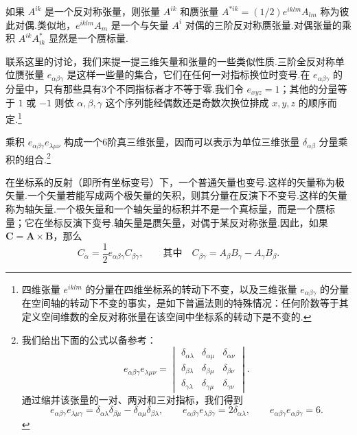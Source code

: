 如果 $A^{ik}$ 是一个反对称张量，则张量 $A^{ik}$ 和赝张量 $A^{*ik}=(1/2)e^{iklm}A_{lm}$ 称为彼此对偶.类似地，$e^{iklm}A_m$ 是一个与矢量 $A^i$ 对偶的三阶反对称赝张量.对偶张量的乘积 $A^{ik}A^{*}_{ik}$ 显然是一个赝标量.

联系这里的讨论，我们来提一提三维矢量和张量的一些类似性质.三阶全反对称单位赝张量 $e_{\alpha\beta\gamma}$ 是这样一些量的集合，它们在任何一对指标换位时变号.在 $e_{\alpha\beta\gamma}$ 的分量中，只有那些具有3个不同指标者才不等于零.我们令 $e_{xyz}=1$；其他的分量等于 $1$ 或 $-1$ 则依 $\alpha,\beta,\gamma$ 这个序列能经偶数还是奇数次换位排成 $x,y,z$ 的顺序而定.\footnote{四维张量 $e^{iklm}$ 的分量在四维坐标系的转动下不变，以及三维张量 $e_{\alpha\beta\gamma}$ 的分量在空间轴的转动下不变的事实，是如下普遍法则的特殊情况：任何阶数等于其定义空间维数的全反对称张量在该空间中坐标系的转动下是不变的.}

乘积 $e_{\alpha\beta\gamma}e_{\lambda\mu\nu}$ 构成一个6阶真三维张量，因而可以表示为单位三维张量 $\delta_{\alpha\beta}$ 分量乘积的组合.\footnote{我们给出下面的公式以备参考：
\begin{equation*}
  e_{\alpha\beta\gamma}e_{\lambda\mu\nu}=\begin{vmatrix}
    \delta_{\alpha\lambda} & \delta_{\alpha\mu} & \delta_{\alpha\nu}\\
    \delta_{\beta\lambda} & \delta_{\beta\mu} & \delta_{\beta\nu}\\
    \delta_{\gamma\lambda} & \delta_{\gamma\mu} & \delta_{\gamma\nu}
  \end{vmatrix}.
\end{equation*}
通过缩并该张量的一对、两对和三对指标，我们得到
\begin{equation*}
  e_{\alpha\beta\gamma}e_{\lambda\mu\gamma}=\delta_{\alpha\lambda}\delta_{\beta\mu}-\delta_{\alpha\mu}\delta_{\beta\lambda},\qquad
  e_{\alpha\beta\gamma}e_{\lambda\beta\gamma}=2\delta_{\alpha\lambda},\qquad
  e_{\alpha\beta\gamma}e_{\alpha\beta\gamma}=6.
\end{equation*}}

在坐标系的反射（即所有坐标变号）下，一个普通矢量也变号.这样的矢量称为极矢量.一个矢量若能写成两个极矢量的矢积，则其分量在反演下不变号.这样的矢量称为轴矢量.一个极矢量和一个轴矢量的标积并不是一个真标量，而是一个赝标量；它在坐标反演下变号.轴矢量是赝矢量，对偶于某反对称张量.因此，如果 $\boldsymbol{C}=\boldsymbol{A}\times\boldsymbol{B}$，那么
\begin{equation*}
  C_\alpha=\frac{1}{2}e_{\alpha\beta\gamma}C_{\beta\gamma},\qquad
  \text{其中}\quad C_{\beta\gamma}=A_\beta B_\gamma-A_\gamma B_\beta.
\end{equation*}


